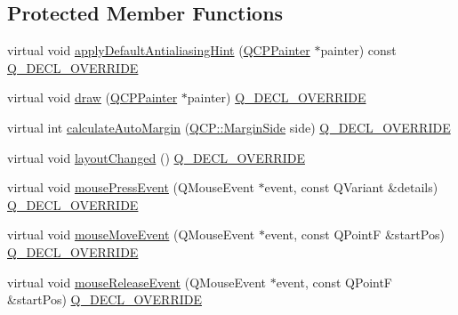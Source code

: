 \subsection*{Protected Member Functions}
\begin{DoxyCompactItemize}
\item 
virtual void \mbox{\hyperlink{class_q_c_p_axis_rect_a4a318008e2b7f881a14c3d97186b31f9}{apply\+Default\+Antialiasing\+Hint}} (\mbox{\hyperlink{class_q_c_p_painter}{Q\+C\+P\+Painter}} $\ast$painter) const \mbox{\hyperlink{qcustomplot_8h_a42cc5eaeb25b85f8b52d2a4b94c56f55}{Q\+\_\+\+D\+E\+C\+L\+\_\+\+O\+V\+E\+R\+R\+I\+DE}}
\item 
virtual void \mbox{\hyperlink{class_q_c_p_axis_rect_af710c50530e370539a4439d6c4db9090}{draw}} (\mbox{\hyperlink{class_q_c_p_painter}{Q\+C\+P\+Painter}} $\ast$painter) \mbox{\hyperlink{qcustomplot_8h_a42cc5eaeb25b85f8b52d2a4b94c56f55}{Q\+\_\+\+D\+E\+C\+L\+\_\+\+O\+V\+E\+R\+R\+I\+DE}}
\item 
virtual int \mbox{\hyperlink{class_q_c_p_axis_rect_ac51055d83f5f414b6d013d3a24b0a941}{calculate\+Auto\+Margin}} (\mbox{\hyperlink{namespace_q_c_p_a7e487e3e2ccb62ab7771065bab7cae54}{Q\+C\+P\+::\+Margin\+Side}} side) \mbox{\hyperlink{qcustomplot_8h_a42cc5eaeb25b85f8b52d2a4b94c56f55}{Q\+\_\+\+D\+E\+C\+L\+\_\+\+O\+V\+E\+R\+R\+I\+DE}}
\item 
virtual void \mbox{\hyperlink{class_q_c_p_axis_rect_a575e38ac71a21906dc2d7b3364db2d62}{layout\+Changed}} () \mbox{\hyperlink{qcustomplot_8h_a42cc5eaeb25b85f8b52d2a4b94c56f55}{Q\+\_\+\+D\+E\+C\+L\+\_\+\+O\+V\+E\+R\+R\+I\+DE}}
\item 
virtual void \mbox{\hyperlink{class_q_c_p_axis_rect_aa9a7c807eaa4666870ac94aa6abc4dde}{mouse\+Press\+Event}} (Q\+Mouse\+Event $\ast$event, const Q\+Variant \&details) \mbox{\hyperlink{qcustomplot_8h_a42cc5eaeb25b85f8b52d2a4b94c56f55}{Q\+\_\+\+D\+E\+C\+L\+\_\+\+O\+V\+E\+R\+R\+I\+DE}}
\item 
virtual void \mbox{\hyperlink{class_q_c_p_axis_rect_a9cd27ad8c5cfb49aefd9dbb30def4beb}{mouse\+Move\+Event}} (Q\+Mouse\+Event $\ast$event, const Q\+PointF \&start\+Pos) \mbox{\hyperlink{qcustomplot_8h_a42cc5eaeb25b85f8b52d2a4b94c56f55}{Q\+\_\+\+D\+E\+C\+L\+\_\+\+O\+V\+E\+R\+R\+I\+DE}}
\item 
virtual void \mbox{\hyperlink{class_q_c_p_axis_rect_a6c89b988d3a0b93c0878f0ebdb5037f4}{mouse\+Release\+Event}} (Q\+Mouse\+Event $\ast$event, const Q\+PointF \&start\+Pos) \mbox{\hyperlink{qcustomplot_8h_a42cc5eaeb25b85f8b52d2a4b94c56f55}{Q\+\_\+\+D\+E\+C\+L\+\_\+\+O\+V\+E\+R\+R\+I\+DE}}

\end{DoxyCompactItemize}
